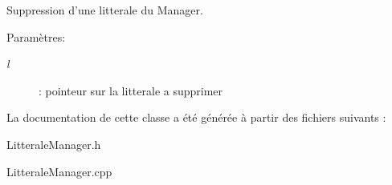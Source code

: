Suppression d'une litterale du Manager. 

\begin{Desc}
\item[Paramètres:]
\begin{description}
\item[{\em l}]: pointeur sur la litterale a supprimer \end{description}
\end{Desc}


La documentation de cette classe a été générée à partir des fichiers suivants :\begin{CompactItemize}
\item 
LitteraleManager.h\item 
LitteraleManager.cpp\end{CompactItemize}

